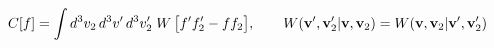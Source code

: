\documentclass[preview]{standalone}
\begin{document}
\begin{align*}
\special{dvisvgm:raw <g id='unique000'>}C[f]=\int d^3v_2\,d^3v'\,d^3v_2'\;W\,\big[f'f_2'-ff_2\big],\qquad W(\va v',\va v_2'|\va v,\va v_2)=W(\va v,\va v_2|\va v',\va v_2')\special{dvisvgm:raw </g>}
\end{align*}
\end{document}
